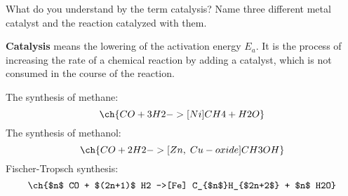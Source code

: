 
\begin{question}
What do you understand by the term catalysis? Name three different metal catalyst and the reaction catalyzed with them.

\end{question}

\begin{solution}
\textbf{Catalysis} means the lowering of the activation energy $E_a$. It is the process of increasing the rate of a chemical reaction by adding a catalyst, which is not consumed in the course of the reaction.
\vspace{-2.5cm}
\begin{center}
 
\end{center}
The synthesis of methane:
\begin{equation}
 \ch{CO + 3 H2 ->[Ni] CH4 + H2O}
\end{equation}
The synthesis of methanol:
\begin{equation}
 \ch{CO + 2 H2 ->[Zn,\;Cu-oxide] CH3OH}
\end{equation}
Fischer-Tropsch synthesis:
\begin{equation}
 \ch{$n$ CO + $(2n+1)$ H2 ->[Fe] C_{$n$}H_{$2n+2$} + $n$ H2O}
\end{equation}
\end{solution}
